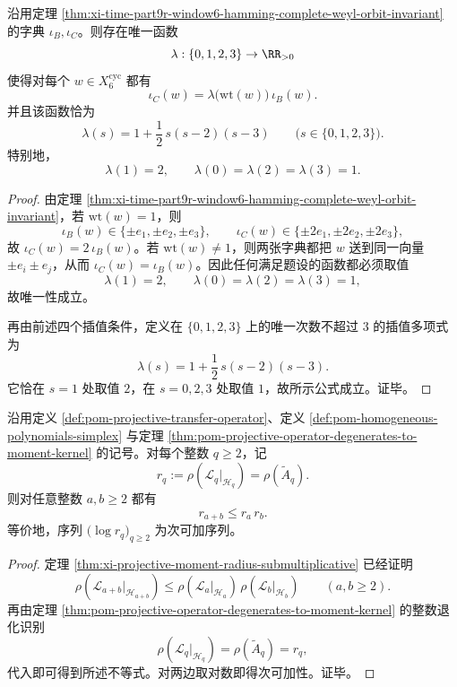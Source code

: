 \begin{proposition}\label{prop:xi-time-part9r-window6-b3-to-c3-weight-radial-dilation}
沿用定理 \ref{thm:xi-time-part9r-window6-hamming-complete-weyl-orbit-invariant} 的字典 \(\iota_B,\iota_C\)。则存在唯一函数
\[
\lambda:\{0,1,2,3\}\to \RR_{>0}
\]
使得对每个 \(w\in X_6^{\mathrm{cyc}}\) 都有
\[
\iota_C(w)=\lambda\bigl(\mathrm{wt}(w)\bigr)\,\iota_B(w).
\]
并且该函数恰为
\[
\lambda(s)=1+\frac12\,s(s-2)(s-3)
\qquad
\bigl(s\in\{0,1,2,3\}\bigr).
\]
特别地，
\[
\lambda(1)=2,
\qquad
\lambda(0)=\lambda(2)=\lambda(3)=1.
\]
\end{proposition}
\begin{proof}
由定理 \ref{thm:xi-time-part9r-window6-hamming-complete-weyl-orbit-invariant}，若 \(\mathrm{wt}(w)=1\)，则
\[
\iota_B(w)\in\{\pm e_1,\pm e_2,\pm e_3\},
\qquad
\iota_C(w)\in\{\pm 2e_1,\pm 2e_2,\pm 2e_3\},
\]
故 \(\iota_C(w)=2\,\iota_B(w)\)。若 \(\mathrm{wt}(w)\neq 1\)，则两张字典都把 \(w\) 送到同一向量 \(\pm e_i\pm e_j\)，从而 \(\iota_C(w)=\iota_B(w)\)。因此任何满足题设的函数都必须取值
\[
\lambda(1)=2,
\qquad
\lambda(0)=\lambda(2)=\lambda(3)=1,
\]
故唯一性成立。

再由前述四个插值条件，定义在 \(\{0,1,2,3\}\) 上的唯一次数不超过 \(3\) 的插值多项式为
\[
\lambda(s)=1+\frac12\,s(s-2)(s-3).
\]
它恰在 \(s=1\) 处取值 \(2\)，在 \(s=0,2,3\) 处取值 \(1\)，故所示公式成立。证毕。
\end{proof}

\begin{theorem}\label{thm:xi-time-part9r-moment-kernel-radius-submultiplicative}
沿用定义 \ref{def:pom-projective-transfer-operator}、定义 \ref{def:pom-homogeneous-polynomials-simplex} 与定理 \ref{thm:pom-projective-operator-degenerates-to-moment-kernel} 的记号。对每个整数 \(q\ge 2\)，记
\[
r_q:=\rho(\mathcal L_q|_{\mathcal H_q})=\rho(\widetilde A_q).
\]
则对任意整数 \(a,b\ge 2\) 都有
\[
r_{a+b}\le r_a\,r_b.
\]
等价地，序列 \(\bigl(\log r_q\bigr)_{q\ge 2}\) 为次可加序列。
\end{theorem}
\begin{proof}
定理 \ref{thm:xi-projective-moment-radius-submultiplicative} 已经证明
\[
\rho(\mathcal L_{a+b}|_{\mathcal H_{a+b}})
\le
\rho(\mathcal L_a|_{\mathcal H_a})\,
\rho(\mathcal L_b|_{\mathcal H_b})
\qquad(a,b\ge 2).
\]
再由定理 \ref{thm:pom-projective-operator-degenerates-to-moment-kernel} 的整数退化识别
\[
\rho(\mathcal L_q|_{\mathcal H_q})=\rho(\widetilde A_q)=r_q,
\]
代入即可得到所述不等式。对两边取对数即得次可加性。证毕。
\end{proof}

